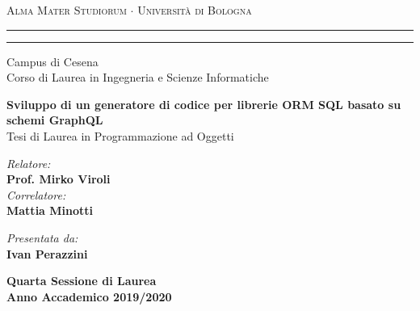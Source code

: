 
\begin{titlepage}
\begin{center}
{{\Large{\textsc{Alma Mater Studiorum $\cdot$ Universit\`a di
Bologna}}}} \rule[0.1cm]{15.8cm}{0.1mm}
\rule[0.5cm]{15.8cm}{0.6mm}
\large{Campus di Cesena\\
Corso di Laurea in Ingegneria e Scienze Informatiche}
\end{center}
\vspace{8mm}
\begin{center}
\LARGE\textbf{Sviluppo di un generatore di codice per librerie ORM SQL basato su schemi GraphQL}\\
\vspace{8mm}
\large{Tesi di Laurea in Programmazione ad Oggetti}
\par
\end{center}
\vspace{40mm}
\noindent
\begin{minipage}[t]{0.47\textwidth}
\large{\emph{Relatore:}}\\
\large\textbf{Prof. Mirko Viroli}\\
\large{\emph{Correlatore:}}\\
\large\textbf{Mattia Minotti}
\end{minipage}
\hfill
\begin{minipage}[t]{0.47\textwidth}\raggedleft
\large{\emph{Presentata da:}}\\
\large\textbf{Ivan Perazzini}
\end{minipage}
\vspace{20mm}
\begin{center}
{\large{\bf Quarta Sessione di Laurea\\%
Anno Accademico 2019/2020}}%
\end{center}
\end{titlepage}